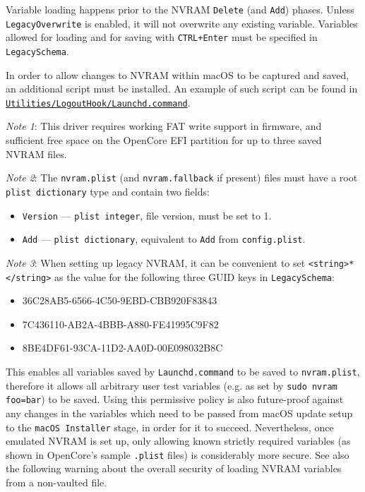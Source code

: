 \documentclass[]{article}
\providecommand{\tightlist}{%
  \setlength{\itemsep}{0pt}\setlength{\parskip}{0pt}}
\begin{document}
Variable loading happens prior to the NVRAM \texttt{Delete} (and \texttt{Add}) phases. Unless
\texttt{LegacyOverwrite} is enabled, it will not overwrite any existing variable.
Variables allowed for loading and for saving with \texttt{CTRL+Enter} must be specified in \texttt{LegacySchema}.

In order to allow changes to NVRAM within macOS to be captured and saved,
an additional script must be installed. An example of such script can be found in
\href{https://github.com/acidanthera/OpenCorePkg/tree/master/Utilities/LogoutHook/Launchd.command}{\texttt{Utilities/LogoutHook/Launchd.command}}.

\emph{Note 1}: This driver requires working FAT write support in firmware, and sufficient free
space on the OpenCore EFI partition for up to three saved NVRAM files.

\emph{Note 2}: The \texttt{nvram.plist} (and \texttt{nvram.fallback} if present) files must have a
root \texttt{plist\ dictionary} type and contain two fields:
\begin{itemize}
\tightlist
 \item \texttt{Version} --- \texttt{plist\ integer}, file version, must be set to 1.
 \item \texttt{Add} --- \texttt{plist\ dictionary}, equivalent to \texttt{Add} from
 \texttt{config.plist}.
\end{itemize}

\emph{Note 3}: When setting up legacy NVRAM, it can be convenient to set \texttt{<string>*</string>}
as the value for the following three GUID keys in \texttt{LegacySchema}:
\begin{itemize}
\tightlist
 \item 36C28AB5-6566-4C50-9EBD-CBB920F83843
 \item 7C436110-AB2A-4BBB-A880-FE41995C9F82
 \item 8BE4DF61-93CA-11D2-AA0D-00E098032B8C
\end{itemize}
This enables all variables saved by \texttt{Launchd.command} to be saved to \texttt{nvram.plist},
therefore it allows all arbitrary user test variables (e.g. as set by \texttt{sudo nvram foo=bar})
to be saved. Using this permissive policy is also future-proof against any changes in the variables
which need to be passed from macOS update setup to the \texttt{macOS Installer} stage, in order for
it to succeed.
Nevertheless, once emulated NVRAM is set up, only allowing known strictly required variables
(as shown in OpenCore's sample \texttt{.plist} files) is considerably more secure. See also the
following warning about the overall security of loading NVRAM variables from a non-vaulted file.
\end{document}
